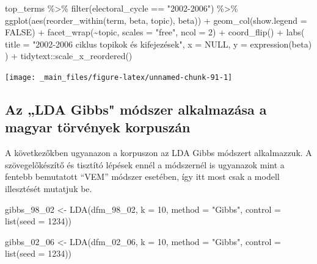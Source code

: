 \documentclass[
]{book}
\newenvironment{Shaded}{\begin{snugshade}}{\end{snugshade}}
\newcommand{\AttributeTok}[1]{\textcolor[rgb]{0.77,0.63,0.00}{#1}}
\newcommand{\ConstantTok}[1]{\textcolor[rgb]{0.00,0.00,0.00}{#1}}
\newcommand{\DecValTok}[1]{\textcolor[rgb]{0.00,0.00,0.81}{#1}}
\newcommand{\FunctionTok}[1]{\textcolor[rgb]{0.00,0.00,0.00}{#1}}
\newcommand{\NormalTok}[1]{#1}
\newcommand{\OtherTok}[1]{\textcolor[rgb]{0.56,0.35,0.01}{#1}}
\newcommand{\SpecialCharTok}[1]{\textcolor[rgb]{0.00,0.00,0.00}{#1}}
\newcommand{\StringTok}[1]{\textcolor[rgb]{0.31,0.60,0.02}{#1}}
\begin{document}
\begin{Shaded}
\begin{Highlighting}[]
\NormalTok{top\_terms }\SpecialCharTok{\%\textgreater{}\%}
  \FunctionTok{filter}\NormalTok{(electoral\_cycle }\SpecialCharTok{==} \StringTok{"2002{-}2006"}\NormalTok{) }\SpecialCharTok{\%\textgreater{}\%}
  \FunctionTok{ggplot}\NormalTok{(}\FunctionTok{aes}\NormalTok{(}\FunctionTok{reorder\_within}\NormalTok{(term, beta, topic), beta)) }\SpecialCharTok{+}
  \FunctionTok{geom\_col}\NormalTok{(}\AttributeTok{show.legend =} \ConstantTok{FALSE}\NormalTok{) }\SpecialCharTok{+}
  \FunctionTok{facet\_wrap}\NormalTok{(}\SpecialCharTok{\textasciitilde{}}\NormalTok{topic, }\AttributeTok{scales =} \StringTok{"free"}\NormalTok{, }\AttributeTok{ncol =} \DecValTok{2}\NormalTok{) }\SpecialCharTok{+}
  \FunctionTok{coord\_flip}\NormalTok{() }\SpecialCharTok{+}
  \FunctionTok{labs}\NormalTok{(}
    \AttributeTok{title =} \StringTok{"2002{-}2006 ciklus topikok és kifejezések"}\NormalTok{,}
    \AttributeTok{x =} \ConstantTok{NULL}\NormalTok{,}
    \AttributeTok{y =} \FunctionTok{expression}\NormalTok{(beta)}
\NormalTok{  ) }\SpecialCharTok{+}
\NormalTok{  tidytext}\SpecialCharTok{::}\FunctionTok{scale\_x\_reordered}\NormalTok{()}
\end{Highlighting}
\end{Shaded}

\begin{center}\texttt{[image: \_main\_files/figure-latex/unnamed-chunk-91-1]} \end{center}

\hypertarget{az-lda-gibbs-muxf3dszer-alkalmazuxe1sa-a-magyar-tuxf6rvuxe9nyek-korpuszuxe1n}{%
\subsection{Az „LDA Gibbs" módszer alkalmazása a magyar törvények
korpuszán}\label{az-lda-gibbs-muxf3dszer-alkalmazuxe1sa-a-magyar-tuxf6rvuxe9nyek-korpuszuxe1n}}

A következőkben ugyanazon a korpuszon az LDA Gibbs módszert alkalmazzuk.
A szövegelőkészítő és tisztító lépések ennél a módszernél is ugyanazok
mint a fentebb bemutatott ``VEM'' módszer esetében, így itt most csak a
modell illesztését mutatjuk be.

\begin{Shaded}
\begin{Highlighting}[]

\NormalTok{gibbs\_98\_02 }\OtherTok{\textless{}{-}} \FunctionTok{LDA}\NormalTok{(dfm\_98\_02, }\AttributeTok{k =} \DecValTok{10}\NormalTok{, }\AttributeTok{method =} \StringTok{"Gibbs"}\NormalTok{, }\AttributeTok{control =} \FunctionTok{list}\NormalTok{(}\AttributeTok{seed =} \DecValTok{1234}\NormalTok{))}

\NormalTok{gibbs\_02\_06 }\OtherTok{\textless{}{-}} \FunctionTok{LDA}\NormalTok{(dfm\_02\_06, }\AttributeTok{k =} \DecValTok{10}\NormalTok{, }\AttributeTok{method =} \StringTok{"Gibbs"}\NormalTok{, }\AttributeTok{control =} \FunctionTok{list}\NormalTok{(}\AttributeTok{seed =} \DecValTok{1234}\NormalTok{))}
\end{Highlighting}
\end{Shaded}
\end{document}
